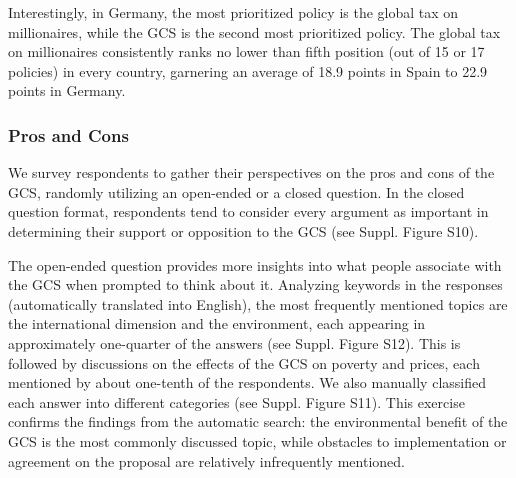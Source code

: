 \documentclass[12pt,english]{article}
\begin{document}
Interestingly, in Germany, the most prioritized policy is the global tax on millionaires, while the GCS is the second most prioritized policy. The global tax on millionaires consistently ranks no lower than fifth position (out of 15 or 17 policies) in every country, garnering an average of 18.9 points in Spain to 22.9 points in Germany.

  
\subsubsection{Pros and Cons}\label{subsubsec:pros_cons}

We survey respondents to gather their perspectives on the pros and cons of the GCS, randomly utilizing an open-ended or a closed question. In the closed question format, respondents tend to consider every argument as important in determining their support or opposition to the GCS (see Suppl. Figure S10). %

The open-ended question provides more insights into what people associate with the GCS when prompted to think about it. %
Analyzing keywords in the responses (automatically translated into English), the most frequently mentioned topics are the international dimension and the environment, each appearing in approximately one-quarter of the answers (see Suppl. Figure S12). %
This is followed by discussions on the effects of the GCS on poverty and prices, each mentioned by about one-tenth of the respondents. We also manually classified each answer into different categories (see Suppl. Figure S11). %
This exercise confirms the findings from the automatic search: the environmental benefit of the GCS is the most commonly discussed topic, while obstacles to implementation or agreement on the proposal are relatively infrequently mentioned.%
\end{document}
